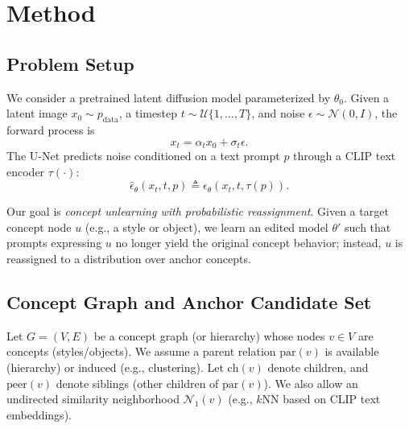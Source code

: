 \section{Method}
\label{sec:method}

\subsection{Problem Setup}
\label{sec:setup}

We consider a pretrained latent diffusion model parameterized by $\theta_0$.
Given a latent image $x_0 \sim p_{\text{data}}$, a timestep $t \sim \mathcal{U}\{1,\dots,T\}$, and noise $\epsilon \sim \mathcal{N}(0,I)$, the forward process is
\begin{equation}
x_t = \alpha_t x_0 + \sigma_t \epsilon.
\end{equation}
The U-Net predicts noise conditioned on a text prompt $p$ through a CLIP text encoder $\tau(\cdot)$:
\begin{equation}
\hat{\epsilon}_{\theta}(x_t,t,p) \triangleq \epsilon_{\theta}(x_t,t,\tau(p)).
\end{equation}

Our goal is \emph{concept unlearning with probabilistic reassignment}.
Given a target concept node $u$ (e.g., a style or object), we learn an edited model $\theta'$ such that prompts expressing $u$ no longer yield the original concept behavior; instead, $u$ is {reassigned} to a distribution over {anchor concepts}.

\subsection{Concept Graph and Anchor Candidate Set}
\label{sec:graph}

Let $G=(V,E)$ be a concept graph (or hierarchy) whose nodes $v\in V$ are concepts (styles/objects). We assume a parent relation $\mathrm{par}(v)$ is available (hierarchy) or induced (e.g., clustering). Let $\mathrm{ch}(v)$ denote children, and $\mathrm{peer}(v)$ denote siblings (other children of $\mathrm{par}(v)$).
We also allow an undirected similarity neighborhood $\mathcal{N}_1(v)$ (e.g., $k$NN based on CLIP text embeddings).


